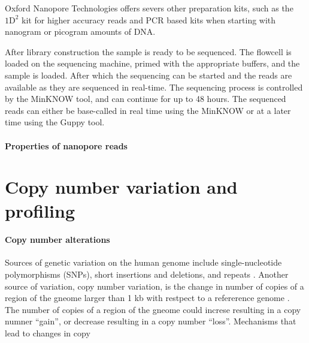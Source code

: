 Oxford Nanopore Technologies offers severs other preparation kits, such
as the $\text{1D}^2$ kit for higher accuracy reads and PCR based kits when
starting with nanogram or picogram amounts of DNA.

After library construction the sample is ready to be sequenced. The
flowcell is loaded on the sequencing machine, primed with the appropriate
buffers, and the sample is loaded. After which the sequencing can be
started and the reads are available as they are sequenced in real-time.
%
The sequencing process is controlled by the MinKNOW tool, and can
continue for up to 48 hours.
The sequenced reads can either be base-called in real time using the
MinKNOW or at a later time using the Guppy tool.

\paragraph{Properties of nanopore reads}



\section{Copy number variation and profiling}
\paragraph{Copy number alterations}
Sources of genetic variation on the human genome include
single-nucleotide polymorphisms (SNPs), short insertions and deletions, and
repeats \citep{}. 
Another source of variation, copy number variation, is the change in
number of copies of a region of the gneome larger than 1 kb with
restpect to a refererence genome
\citep{redon2006global,feuk2006structural}.  The number of copies of a
region of the gneome could increse resulting in a copy numner ``gain'',
or decrease resulting in a copy number ``loss''. 
Mechanisms that lead to changes in copy 




